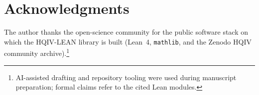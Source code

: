 \documentclass[11pt]{amsart}
\begin{document}
\section*{Acknowledgments}
The author thanks the open-science community for the public software stack on which
the HQIV-LEAN library is built (Lean~4, \texttt{mathlib}, and the Zenodo HQIV
community archive).\footnote{AI-assisted drafting and repository tooling were used
during manuscript preparation; formal claims refer to the cited Lean modules.}



\end{document}
